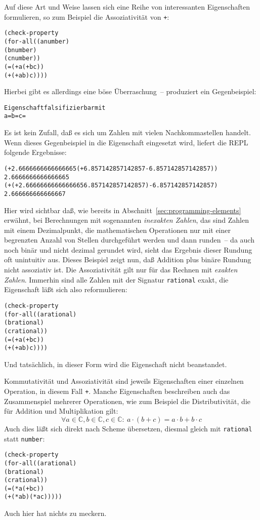 Auf diese Art und Weise lassen sich eine Reihe von interessanten
Eigenschaften formulieren, so zum Beispiel die Assoziativität von
\texttt{+}:\label{sec:plus-not-associative}
%
\begin{alltt}
(check-property
 (for-all ((a number)
           (b number)
           (c number))
    (= (+ a (+ b c))
       (+ (+ a b) c))))
\end{alltt}
%
Hierbei gibt es allerdings eine böse Überraschung~-- \drscheme{} produziert
ein Gegenbeispiel:
%
\begin{alltt}
Eigenschaft falsifizierbar mit
  a =  b =  c = 
\end{alltt}
%
Es ist kein Zufall, daß es sich um Zahlen mit vielen Nachkommastellen
handelt.  Wenn dieses Gegenbeispiel in die Eigenschaft eingesetzt
wird, liefert die REPL folgende Ergebnisse:
%
\begin{alltt}
(+ 2.6666666666666665 (+ 6.857142857142857 -6.857142857142857))
\evalsto{} 2.6666666666666665
(+ (+ 2.6666666666666665 6.857142857142857) -6.857142857142857)
\evalsto{} 2.666666666666667
\end{alltt}
%
Hier wird sichtbar daß, wie bereits in
Abschnitt~\ref{sec:programming-elements} erwähnt, bei Berechnungen mit
sogenannten \textit{inexakten Zahlen}, das sind
Zahlen mit einem Dezimalpunkt, die mathematischen Operationen nur mit
einer begrenzten Anzahl von Stellen durchgeführt werden und dann runden~-- da
auch noch binär und nicht dezimal gerundet wird, sieht das Ergebnis
dieser Rundung oft unintuitiv aus.  Dieses Beispiel zeigt nun, daß
Addition plus binäre Rundung nicht assoziativ ist.  Die Assoziativität
gilt nur für das Rechnen mit \textit{exakten Zahlen}.  Immerhin sind alle Zahlen mit der Signatur
\texttt{rational} exakt, die
Eigenschaft läßt sich also reformulieren:
%
\begin{alltt}
(check-property
 (for-all ((a rational)
           (b rational)
           (c rational))
    (= (+ a (+ b c))
       (+ (+ a b) c))))
\end{alltt}
%
Und tatsächlich, in dieser Form wird die Eigenschaft nicht
beanstandet.

Kommutativität und Assoziativität sind jeweils Eigenschaften einer
einzelnen Operation, in diesem Fall \texttt{+}.  Manche Eigenschaften
beschreiben auch das Zusammenspiel mehrerer Operationen, wie zum
Beispiel die Distributivität, die für Addition und Multiplikation
gilt:
%
\begin{displaymath}
\forall a \in \mathbb{C}, b \in \mathbb{C}, c \in \mathbb{C}:\
a\cdot(b+c) = a\cdot b + b\cdot c
\end{displaymath}
%
Auch dies läßt sich direkt nach Scheme übersetzen, diesmal gleich mit
\texttt{rational} statt \texttt{number}:
%
\begin{alltt}
(check-property
 (for-all ((a rational)
           (b rational)
           (c rational))
   (= (* a (+ b c))
      (+ (* a b) (* a c)))))
\end{alltt}
%
Auch hier hat \drscheme{} nichts zu meckern.

